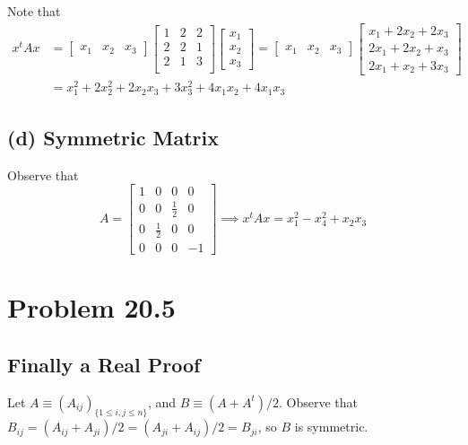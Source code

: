 \documentclass{article}
\theoremstyle{named}
\begin{document}
Note that 
\begin{align*}
    x^t A x &= \begin{bmatrix} x_1 & x_2 & x_3 \end{bmatrix} \begin{bmatrix} 1 & 2 & 2 \\ 2 & 2 & 1 \\ 2 & 1 & 3 \\ \end{bmatrix} \begin{bmatrix} x_1 \\ x_2 \\ x_3 \end{bmatrix} = \begin{bmatrix} x_1 & x_2 & x_3 \end{bmatrix} \begin{bmatrix} x_1 + 2x_2 + 2x_3 \\ 2x_1 + 2x_2 + x_3 \\ 2x_1 + x_2 + 3x_3 \end{bmatrix} \\
            &= x_1^2 + 2x_2^2 + 2x_2 x_3 + 3x_3^2 + 4x_1x_2 + 4x_1 x_3
\end{align*}

\subsection*{(d) Symmetric Matrix} 

Observe that
\[
    A = \begin{bmatrix} 1 & 0 & 0 & 0 \\ 0 & 0 & \frac{1}{2} & 0 \\ 0 & \frac{1}{2} & 0 & 0 \\ 0 & 0 & 0 & -1 \end{bmatrix} \implies x^t A x = x_1^2 - x_4^2 + x_2 x_3
\]

\section{Problem 20.5} 

\subsection{Finally a Real Proof}

Let $A \equiv (A_{ij})_{\{1 \leq i, j \leq n\}}$, and $B \equiv (A + A^t) / 2$. Observe that $B_{ij} = (A_{ij} + A_{ji}) / 2 = (A_{ji} + A_{ij}) / 2 = B_{ji}$, so $B$ is symmetric. 
\end{document}
